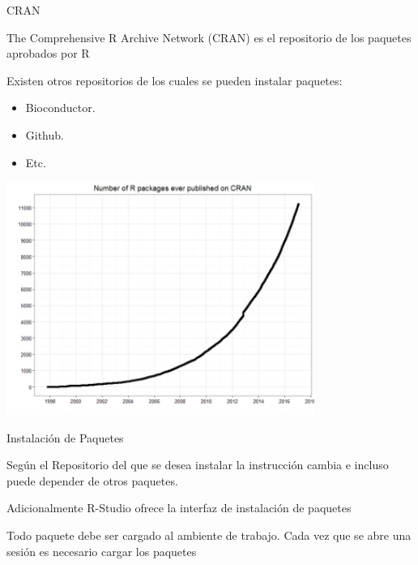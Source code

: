 \documentclass[ignorenonframetext,]{beamer}
\providecommand{\tightlist}{%
  \setlength{\itemsep}{0pt}\setlength{\parskip}{0pt}}
\begin{document}
\begin{frame}{CRAN}

The Comprehensive R Archive Network (CRAN) es el repositorio de los
paquetes aprobados por R

Existen otros repositorios de los cuales se pueden instalar paquetes:

\begin{itemize}
\tightlist
\item
  Bioconductor.
\item
  Github.
\item
  Etc.
\end{itemize}

\begin{center}\includegraphics[width=380px]{./img/img4} \end{center}

\end{frame}

\begin{frame}{Instalación de Paquetes}

Según el Repositorio del que se desea instalar la instrucción cambia e
incluso puede depender de otros paquetes.

Adicionalmente R-Studio ofrece la interfaz de instalación de paquetes

Todo paquete debe ser cargado al ambiente de trabajo. Cada vez que se
abre una sesión es necesario cargar los paquetes

\end{frame}
\end{document}
